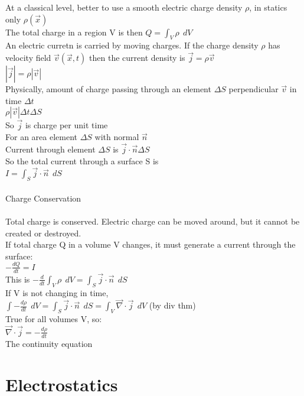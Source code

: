 \documentclass[a4paper,11pt]{article}
\begin{document}
At a classical level, better to use a smooth electric charge density $\rho$, in statics only $\rho (\vec{x})$\\
The total charge in a region V is then $Q=\int_V \rho ~~dV$\\
An electric curretn is carried by moving charges. If the charge density $\rho$ has velocity field $\vec{v} (\vec{x}, t)$ then the current density is $\vec{j} = \rho \vec{v}$\\
$|\vec{j}|=\rho |\vec{v}|$\\
Physically, amount of charge passing through an element $\Delta S$ perpendicular $\vec{v}$ in time $\Delta t$\\
$\rho |\vec{v}| \Delta t \Delta S$\\
So $\vec{j}$ is charge per unit time\\
For an area element $\Delta S$ with normal $\vec{n}$\\
Current through element $\Delta S$ is $\vec{j} \cdot \vec{n} \Delta S$\\
So the total current through a surface S is\\
$I=\int_S \vec{j} \cdot \vec{n} ~~dS$\\
\\
Charge Conservation\\
\\
Total charge is conserved. Electric charge can be moved around, but it cannot be created or destroyed.\\
If total charge Q in a volume V changes, it must generate a current through the surface:\\
$-\frac{dQ}{dt} = I$\\
This is 
$-\frac{d}{dt} \int_V \rho ~~dV = \int_S \vec{j} \cdot \vec{n} ~~dS$\\
If V is not changing in time,\\
$\int -\frac{d \rho}{dt}~~ dV =\int_S \vec{j} \cdot \vec{n}~~ dS = \int_V \vec{\nabla} \cdot \vec{j}~~ dV$ (by div thm)\\
True for all volumes V, so:\\
$\vec{\nabla} \cdot \vec{j} = -\frac{d\rho}{dt}$\\
The continuity equation

\section{Electrostatics}
\end{document}

